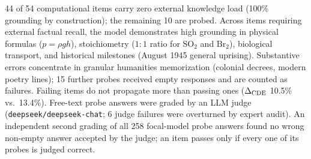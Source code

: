 44 of 54 computational items carry zero external knowledge load (100\% grounding by construction); the remaining 10 are probed. Across items requiring external factual recall, the model demonstrates high grounding in physical formulas ($p = \rho g h$), stoichiometry ($1:1$ ratio for $\text{SO}_2$ and $\text{Br}_2$), biological transport, and historical milestones (August 1945 general uprising). Substantive errors concentrate in granular humanities memorization (colonial decrees, modern poetry lines); 15 further probes received empty responses and are counted as failures. Failing items do not propagate more than passing ones ($\Delta_{\mathrm{CDE}}$ 10.5\% vs.\ 13.4\%). Free-text probe answers were graded by an LLM judge (\texttt{deepseek/deepseek-chat}; 6 judge failures were overturned by expert audit). An independent second grading of all 258 focal-model probe answers found no wrong non-empty answer accepted by the judge; an item passes only if every one of its probes is judged correct.
